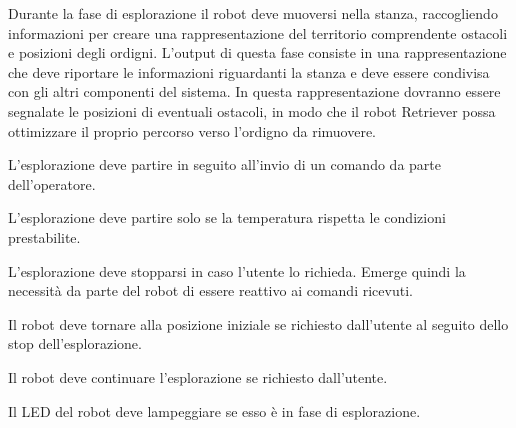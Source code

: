\begin{description}[itemsep=1em]
  \item[\requirementref{R-explore}]

  Durante la fase di esplorazione il robot deve muoversi nella stanza, raccogliendo informazioni per creare una rappresentazione del territorio comprendente ostacoli e posizioni degli ordigni.
  L'output di questa fase consiste in una rappresentazione che deve riportare le informazioni riguardanti la stanza e deve essere condivisa con gli altri componenti del sistema.
  In questa rappresentazione dovranno essere segnalate le posizioni di eventuali ostacoli, in modo che il robot Retriever possa ottimizzare il proprio percorso verso l'ordigno da rimuovere.

  \item[\requirementref{R-startExplore}]

  L'esplorazione deve partire in seguito all'invio di un comando da parte dell'operatore.

  \item[\requirementref{R-TempOk}]

  L'esplorazione deve partire solo se la temperatura rispetta le condizioni prestabilite.

  \item[\requirementref{R-stopExplore}]

  L'esplorazione deve stopparsi in caso l'utente lo richieda.
  Emerge quindi la necessità da parte del robot di essere reattivo ai comandi ricevuti.

  \item[\requirementref{R-backHome}]

  Il robot deve tornare alla posizione iniziale se richiesto dall'utente al seguito dello stop dell'esplorazione.

  \item[\requirementref{R-continueExplore}]

  Il robot deve continuare l'esplorazione se richiesto dall'utente.

  \item[\requirementref{R-blinkLed}]

  Il LED del robot deve lampeggiare se esso è in fase di esplorazione.

  \item[\requirementref{R-consoleUpdate}]


\end{description}
